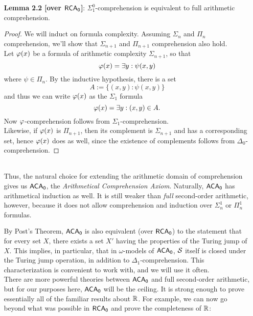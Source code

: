 \documentclass{amsart}
\begin{document}
	\noindent \textbf{Lemma 2.2 [over $\operatorname{\sf{RCA_0}}$]}: $\Sigma_1^0$-comprehension is equivalent to full arithmetic comprehension.
	\begin{proof}
		We will induct on formula complexity. Assuming $\Sigma_n$ and $\Pi_n$ comprehension, we'll show that $\Sigma_{n+1}$ and $\Pi_{n+1}$ comprehension also hold.\\
		
		Let $\varphi(x)$ be a formula of arithmetic complexity $\Sigma_{n+1}$, so that 
		$$
		\varphi(x) = \exists y: \psi(x,y)
		$$
		where $\psi\in \Pi_n$. By the inductive hypothesis, there is a set 
		$$A:= \{(x,y) : \psi(x,y)\}$$
		and thus we can write $\varphi(x)$ as the $\Sigma_1$ formula
		$$
		\varphi(x) = \exists y: (x,y)\in A.
		$$
		Now $\varphi$-comprehension follows from $\Sigma_1$-comprehension.\\
		
		Likewise, if $\varphi(x)$ is $\Pi_{n+1}$, then its complement is $\Sigma_{n+1}$ and has a corresponding set, hence $\varphi(x)$ does as well, since the existence of complements follows from $\Delta_0$-comprehension.
	\end{proof}\\
	
	Thus, the natural choice for extending the arithmetic domain of comprehension gives us $\operatorname{\sf{ACA_0}}$, the \textit{Arithmetical Comprehension Axiom}. Naturally, $\operatorname{\sf{ACA_0}}$ has arithmetical induction as well. It is still weaker than \textit{full} second-order arithmetic, however, because it does not allow comprehension and induction over $\Sigma^1_n$ or $\Pi^1_n$ formulas.
	
	By Post's Theorem, $\operatorname{\sf{ACA_0}}$ is also equivalent (over $\operatorname{\sf{RCA_0}}$) to the statement that for every set $X$, there exists a set $X'$ having the properties of the Turing jump of $X$. This implies, in particular, that in $\omega$-models of $\operatorname{\sf{ACA_0}}$, $\mathcal{S}$ itself is closed under the Turing jump operation, in addition to $\Delta_1$-comprehension. This characterization is convenient to work with, and we will use it often.\\
	
	There are more powerful theories between $\operatorname{\sf{ACA_0}}$ and full second-order arithmetic, but for our purposes here, $\operatorname{\sf{ACA_0}}$ will be the ceiling. It is strong enough to prove essentially all of the familiar results about $\mathbb{R}$. For example, we can now go beyond what was possible in $\operatorname{\sf{RCA_0}}$ and prove the completeness of $\mathbb{R}$:\\
	
\end{document}

